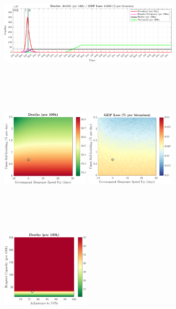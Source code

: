 \documentclass[paper=a4, fontsize=11pt]{scrartcl}
\numberwithin{figure}{section}
\numberwithin{table}{section}
\begin{document}
\begin{figure}[H]
\centering
    \begin{subfigure}[b]{\textwidth}
     	\includegraphics[width=\textwidth,height=5.5cm]{Counterfactuals/UK_swfl}
    \end{subfigure}
    \begin{subfigure}[b]{\textwidth}
      	\includegraphics[width=0.49\textwidth,height=6cm]{UK/SWINE/ero_d}
	\hspace{0.05cm}
    	\includegraphics[width=0.49\textwidth,height=6cm]{UK/SWINE/ero_g}
    \end{subfigure}
    \begin{subfigure}[b]{\textwidth}
      	\includegraphics[width=0.49\textwidth,height=6cm]{UK/SWINE/npl_d}

\end{subfigure}
\end{figure}
\end{document}
